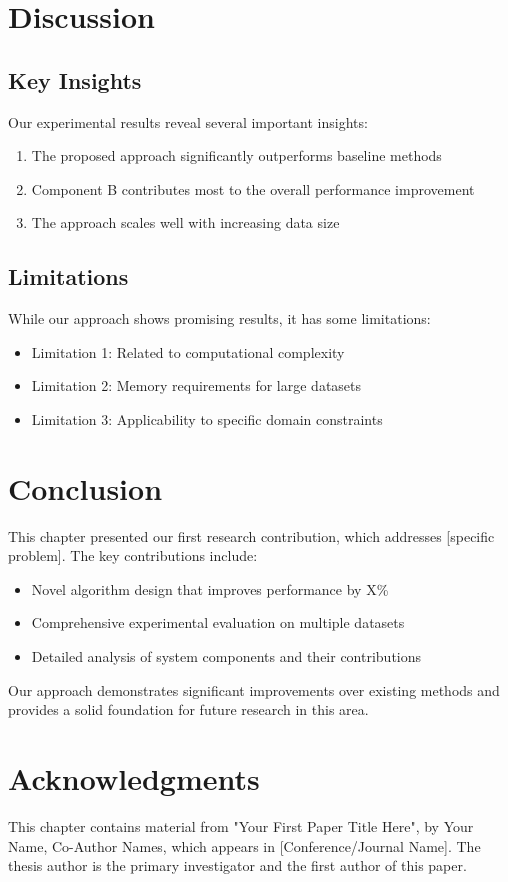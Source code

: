 \section{Discussion}

\subsection{Key Insights}

Our experimental results reveal several important insights:
\begin{enumerate}
    \item The proposed approach significantly outperforms baseline methods
    \item Component B contributes most to the overall performance improvement
    \item The approach scales well with increasing data size
\end{enumerate}

\subsection{Limitations}

While our approach shows promising results, it has some limitations:
\begin{itemize}
    \item Limitation 1: Related to computational complexity
    \item Limitation 2: Memory requirements for large datasets
    \item Limitation 3: Applicability to specific domain constraints
\end{itemize}

\section{Conclusion}

This chapter presented our first research contribution, which addresses [specific problem]. The key contributions include:
\begin{itemize}
    \item Novel algorithm design that improves performance by X\%
    \item Comprehensive experimental evaluation on multiple datasets
    \item Detailed analysis of system components and their contributions
\end{itemize}

Our approach demonstrates significant improvements over existing methods and provides a solid foundation for future research in this area.

\section*{Acknowledgments}
This chapter contains material from "Your First Paper Title Here", by Your Name, Co-Author Names, which appears in [Conference/Journal Name]. The thesis author is the primary investigator and the first author of this paper. 